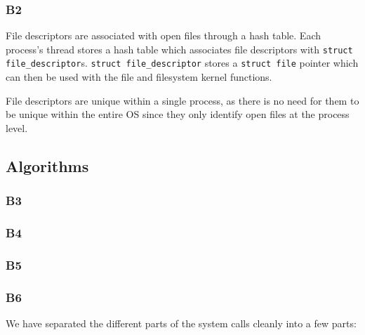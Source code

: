\documentclass[a4wide, 11pt]{article}
\newcommand{\tx}{\texttt}
\begin{document}
\subsubsection{B2}

File descriptors are associated with open files through a hash table. Each process's thread stores a hash table which associates file descriptors with \tx{struct file\_descriptor}s. \tx{struct file\_descriptor} stores a \tx{struct file} pointer which can then be used with the file and filesystem kernel functions.

File descriptors are unique within a single process, as there is no need for them to be unique within the entire OS since they only identify open files at the process level.

\subsection{Algorithms}
\subsubsection{B3}

\subsubsection{B4}

\subsubsection{B5}

\subsubsection{B6}

We have separated the different parts of the system calls cleanly into a few parts:
\end{document}
